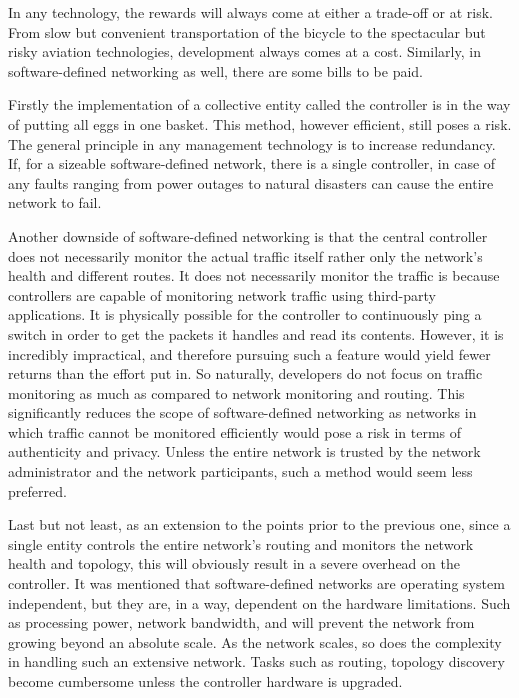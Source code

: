     In any technology, the rewards will always come at either a trade-off or at risk. From slow but convenient transportation of the bicycle to the spectacular but risky aviation technologies, development always comes at a cost.
    Similarly, in software-defined networking as well, there are some bills to be paid.
    
    Firstly the implementation of a collective entity called the controller is in the way of putting all eggs in one basket. This method, however efficient, still poses a risk. The general principle in any management technology is to increase redundancy. If, for a sizeable software-defined network, there is a single controller, in case of any faults ranging from power outages to natural disasters can cause the entire network to fail.  
    
    Another downside of software-defined networking is that the central controller does not necessarily monitor the actual traffic itself rather only the network's health and different routes. It does not necessarily monitor the traffic is because controllers are capable of monitoring network traffic using third-party applications. It is physically possible for the controller to continuously ping a switch in order to get the packets it handles and read its contents. However, it is incredibly impractical, and therefore pursuing such a feature would yield fewer returns than the effort put in. So naturally, developers do not focus on traffic monitoring as much as compared to network monitoring and routing. This significantly reduces the scope of software-defined networking as networks in which traffic cannot be monitored efficiently would pose a risk in terms of authenticity and privacy. Unless the entire network is trusted by the network administrator and the network participants, such a method would seem less preferred.
    
    Last but not least, as an extension to the points prior to the previous one, since a single entity controls the entire network's routing and monitors the network health and topology, this will obviously result in a severe overhead on the controller. It was mentioned that software-defined networks are operating system independent, but they are, in a way, dependent on the hardware limitations. Such as processing power, network bandwidth, and will prevent the network from growing beyond an absolute scale. As the network scales, so does the complexity in handling such an extensive network. Tasks such as routing, topology discovery \cite{netflow2004} become cumbersome unless the controller hardware is upgraded.
    
